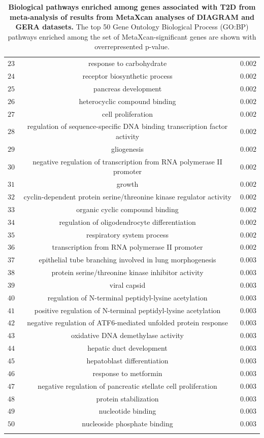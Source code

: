 \documentclass[10pt]{article}
\begin{document}
\begin{table}[!htbp]
{\begin{tabular}{@{\extracolsep{5pt}} ccc}
$23$ & response to carbohydrate & $0.002$ \\ 
$24$ & receptor biosynthetic process & $0.002$ \\ 
$25$ & pancreas development & $0.002$ \\ 
$26$ & heterocyclic compound binding & $0.002$ \\ 
$27$ & cell proliferation & $0.002$ \\ 
$28$ & regulation of sequence-specific DNA binding transcription factor activity & $0.002$ \\ 
$29$ & gliogenesis & $0.002$ \\ 
$30$ & negative regulation of transcription from RNA polymerase II promoter & $0.002$ \\ 
$31$ & growth & $0.002$ \\ 
$32$ & cyclin-dependent protein serine/threonine kinase regulator activity & $0.002$ \\ 
$33$ & organic cyclic compound binding & $0.002$ \\ 
$34$ & regulation of oligodendrocyte differentiation & $0.002$ \\ 
$35$ & respiratory system process & $0.002$ \\ 
$36$ & transcription from RNA polymerase II promoter & $0.002$ \\ 
$37$ & epithelial tube branching involved in lung morphogenesis & $0.003$ \\ 
$38$ & protein serine/threonine kinase inhibitor activity & $0.003$ \\ 
$39$ & viral capsid & $0.003$ \\ 
$40$ & regulation of N-terminal peptidyl-lysine acetylation & $0.003$ \\ 
$41$ & positive regulation of N-terminal peptidyl-lysine acetylation & $0.003$ \\ 
$42$ & negative regulation of ATF6-mediated unfolded protein response & $0.003$ \\ 
$43$ & oxidative DNA demethylase activity & $0.003$ \\ 
$44$ & hepatic duct development & $0.003$ \\ 
$45$ & hepatoblast differentiation & $0.003$ \\ 
$46$ & response to metformin & $0.003$ \\ 
$47$ & negative regulation of pancreatic stellate cell proliferation & $0.003$ \\ 
$48$ & protein stabilization & $0.003$ \\ 
$49$ & nucleotide binding & $0.003$ \\ 
$50$ & nucleoside phosphate binding & $0.003$ \\ 
\hline \\[-1.8ex] 
\end{tabular} 
}
\caption{\textbf{Biological pathways enriched among genes associated with T2D from meta-analysis of results from MetaXcan analyses of DIAGRAM and GERA datasets.} The top 50 Gene Ontology Biological Process (GO:BP) pathways enriched among the set of MetaXcan-significant genes are shown with overrepresented p-value.}  
\end{table} 
\end{document}
